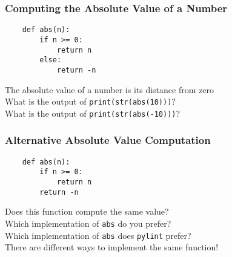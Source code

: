 \documentclass[14pt,aspectratio=169]{beamer}
\begin{document}
%
\begin{frame}[fragile]
  \frametitle{Computing the Absolute Value of a Number}
  \normalsize
  \hspace*{-.65in}
  \begin{minipage}{6in}
    \vspace*{.25in}
    \begin{verbatim}
    def abs(n):
        if n >= 0:
            return n
        else:
            return -n
    \end{verbatim}
  \end{minipage}
  \vspace*{.25in}
  \begin{center}
    \normalsize \noindent The absolute value of a number is its distance from zero \\
    \normalsize \noindent What is the output of {\tt print(str(abs(10)))}? \\
    \normalsize \noindent What is the output of {\tt print(str(abs(-10)))}? \\
  \end{center}
\end{frame}

%
\begin{frame}[fragile]
  \frametitle{Alternative Absolute Value Computation}
  \normalsize
  \hspace*{-.65in}
  \begin{minipage}{6in}
    \vspace*{.25in}
    \begin{verbatim}
    def abs(n):
        if n >= 0:
            return n
        return -n
    \end{verbatim}
  \end{minipage}
  \vspace*{.25in}
  \begin{center}
    \normalsize \noindent Does this function compute the same value? \\
    \normalsize \noindent Which implementation of {\tt abs} do you prefer? \\
    \normalsize \noindent Which implementation of {\tt abs} does {\tt pylint} prefer? \\
    \normalsize \noindent There are different ways to implement the same function! \\
  \end{center}
\end{frame}
\end{document}
